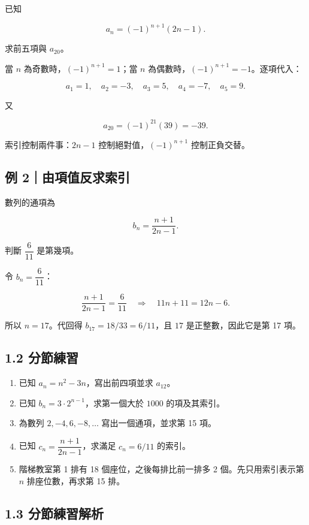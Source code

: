 \documentclass[11pt,a4paper]{article}
\providecommand{\tightlist}{%
  \setlength{\itemsep}{0pt}\setlength{\parskip}{0pt}}
\begin{document}
已知

\[
a_n=(-1)^{n+1}(2n-1).
\]

求前五項與 \(a_{20}\)。

當 \(n\) 為奇數時，\((-1)^{n+1}=1\)；當 \(n\) 為偶數時，\((-1)^{n+1}=-1\)。逐項代入：

\[
a_1=1,\quad a_2=-3,\quad a_3=5,\quad a_4=-7,\quad a_5=9.
\]

又

\[
a_{20}=(-1)^{21}(39)=-39.
\]

索引控制兩件事：\(2n-1\) 控制絕對值，\((-1)^{n+1}\) 控制正負交替。

\subsection{例 2｜由項值反求索引}\label{ux4f8b-2ux7531ux9805ux503cux53cdux6c42ux7d22ux5f15}

數列的通項為

\[
b_n=\frac{n+1}{2n-1}.
\]

判斷 \(\dfrac6{11}\) 是第幾項。

令 \(b_n=\dfrac6{11}\)：

\[
\frac{n+1}{2n-1}=\frac6{11}
\quad\Longrightarrow\quad
11n+11=12n-6.
\]

所以 \(n=17\)。代回得 \(b_{17}=18/33=6/11\)，且 \(17\) 是正整數，因此它是第 17 項。

\subsection{1.2 分節練習}\label{ux5206ux7bc0ux7df4ux7fd2}

\begin{enumerate}
\def\labelenumi{\arabic{enumi}.}
\tightlist
\item
  已知 \(a_n=n^2-3n\)，寫出前四項並求 \(a_{12}\)。
\item
  已知 \(b_n=3\cdot2^{n-1}\)，求第一個大於 \(1000\) 的項及其索引。
\item
  為數列 \(2,-4,6,-8,\ldots\) 寫出一個通項，並求第 15 項。
\item
  已知 \(c_n=\dfrac{n+1}{2n-1}\)，求滿足 \(c_n=6/11\) 的索引。
\item
  階梯教室第 1 排有 18 個座位，之後每排比前一排多 2 個。先只用索引表示第 \(n\) 排座位數，再求第 15 排。
\end{enumerate}

\subsection{1.3 分節練習解析}\label{ux5206ux7bc0ux7df4ux7fd2ux89e3ux6790}
\end{document}
